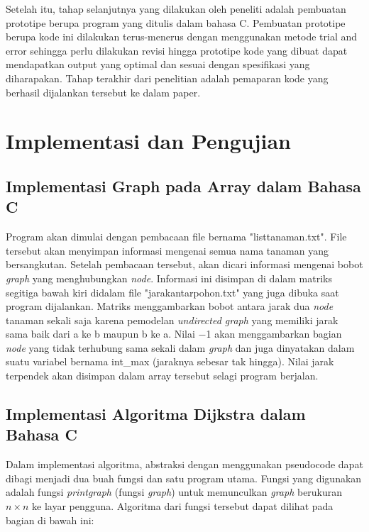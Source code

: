 \documentclass[conference]{IEEEtran}
\begin{document}
Setelah itu, tahap selanjutnya yang dilakukan oleh peneliti adalah pembuatan prototipe berupa program yang ditulis dalam bahasa C. Pembuatan prototipe berupa kode ini dilakukan terus-menerus dengan menggunakan metode trial and error sehingga perlu dilakukan revisi hingga prototipe kode yang dibuat dapat mendapatkan output yang optimal dan sesuai dengan spesifikasi yang diharapakan. Tahap terakhir dari penelitian adalah pemaparan kode yang berhasil dijalankan tersebut ke dalam paper.

\begin{figure}[htp]
    \centering
\end{figure}

\section{Implementasi dan Pengujian}

\subsection{Implementasi Graph pada Array dalam Bahasa C}
Program akan dimulai dengan pembacaan file bernama "listtanaman.txt". File tersebut akan menyimpan informasi mengenai semua nama tanaman yang bersangkutan. Setelah pembacaan tersebut, akan dicari informasi mengenai bobot \textit{graph} yang menghubungkan \textit{node}. Informasi ini disimpan di dalam matriks segitiga bawah kiri didalam file "jarakantarpohon.txt" yang juga dibuka saat program dijalankan. Matriks menggambarkan bobot antara jarak dua \textit{node} tanaman sekali saja karena pemodelan \textit{undirected graph} yang memiliki jarak sama baik dari a ke b maupun b ke a. Nilai $-$1 akan menggambarkan bagian \textit{node} yang tidak terhubung sama sekali dalam \textit{graph} dan juga dinyatakan dalam suatu variabel bernama int\_max (jaraknya sebesar tak hingga). Nilai jarak terpendek akan disimpan dalam array tersebut selagi program berjalan.

\subsection{Implementasi Algoritma Dijkstra dalam Bahasa C}
Dalam implementasi algoritma, abstraksi dengan menggunakan pseudocode dapat dibagi menjadi dua buah fungsi dan satu program utama. Fungsi yang digunakan adalah fungsi \textit{printgraph} (fungsi \textit{graph}) untuk memunculkan \textit{graph} berukuran $n \times n$ ke layar pengguna. Algoritma dari fungsi tersebut dapat dilihat pada bagian di bawah ini:
\end{document}
